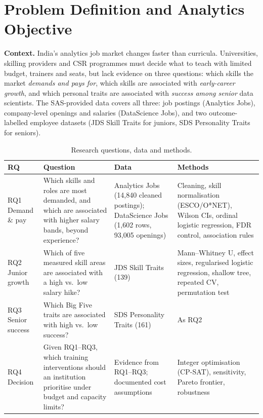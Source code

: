 \section{Problem Definition and Analytics Objective}\label{sec:problem}

\textbf{Context.} India's analytics job market changes faster than curricula. Universities, skilling
providers and CSR programmes must decide what to teach with limited budget, trainers and seats,
but lack evidence on three questions: which skills the market \emph{demands and pays for}, which
skills are associated with \emph{early-career growth}, and which personal traits are associated
with \emph{success among senior} data scientists. The SAS-provided data covers all three: job
postings (Analytics Jobs), company-level openings and salaries (DataScience Jobs), and two
outcome-labelled employee datasets (JDS Skill Traits for juniors, SDS Personality Traits for
seniors).

\begin{center}
\end{center}

\begin{table}[H]\centering\small
\caption{Research questions, data and methods.}\label{tab:rq}
\begin{tabularx}{\linewidth}{@{}L{2.0cm}Y L{3.4cm} L{3.9cm}@{}}
\toprule
\textbf{RQ} & \textbf{Question} & \textbf{Data} & \textbf{Methods}\\
\midrule
RQ1 Demand \& pay & Which skills and roles are most demanded, and which are associated with
higher salary bands, beyond experience? & Analytics Jobs (14,840 cleaned postings); DataScience Jobs
(1,602 rows, 93,005 openings) & Cleaning, skill normalisation (ESCO/O*NET), Wilson CIs, ordinal
logistic regression, FDR control, association rules \\
\addlinespace
RQ2 Junior growth & Which of five measured skill areas are associated with a high vs.\ low salary
hike? & JDS Skill Traits (139) & Mann--Whitney U, effect sizes, regularised logistic regression,
shallow tree, repeated CV, permutation test \\
\addlinespace
RQ3 Senior success & Which Big Five traits are associated with high vs.\ low success? & SDS
Personality Traits (161) & As RQ2 \\
\addlinespace
RQ4 Decision & Given RQ1--RQ3, which training interventions should an institution prioritise under
budget and capacity limits? & Evidence from RQ1--RQ3; documented cost assumptions & Integer
optimisation (CP-SAT), sensitivity, Pareto frontier, robustness \\
\bottomrule
\end{tabularx}
\end{table}

